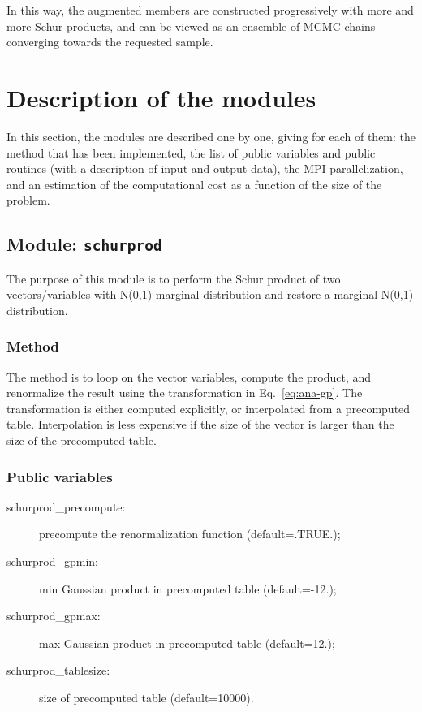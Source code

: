 \documentclass[11pt]{article}
\begin{document}
\noindent
In this way, the augmented members are constructed progressively with more and more Schur products,
and can be viewed as an ensemble of MCMC chains converging towards the requested sample.

\section{Description of the modules}

In this section,
the modules are described one by one,
giving for each of them:
the method that has been implemented,
the list of public variables and public routines
(with a description of input and output data),
the MPI parallelization, and
an estimation of the computational cost
as a function of the size of the problem.

\subsection{Module: {\tt\bf schurprod}}

The purpose of this module is to perform
the Schur product of two vectors/variables with N(0,1) marginal distribution
and restore a marginal N(0,1) distribution.

\subsubsection*{Method}

The method is to loop on the vector variables, compute the product,
and renormalize the result using the transformation in Eq.~\ref{eq:ana-gp}.
The transformation is either computed explicitly,
or interpolated from a precomputed table.
Interpolation is less expensive if the size of the vector
is larger than the size of the precomputed table.

\subsubsection*{Public variables}

\begin{description}
\item[schurprod\_precompute:] precompute the renormalization function (default=.TRUE.);
\item[schurprod\_gpmin:] min Gaussian product in precomputed table (default=-12.);
\item[schurprod\_gpmax:] max Gaussian product in precomputed table (default=12.);
\item[schurprod\_tablesize:] size of precomputed table (default=10000).
\end{description}
\end{document}
